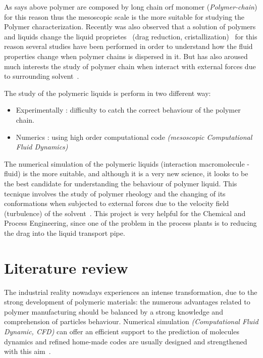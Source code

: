 As says above polymer are composed by long chain orf monomer (\textit{Polymer-chain}) for this reason thus the mesoscopic scale is the more suitable for studying the Polymer characterization. 
Recently was also observed that a solution of polymers and liquids change the liquid proprietes~\cite{keller} (drag reduction, cristallization)~\cite{doi}
for this reason several studies have been performed in order to understand how the fluid properties change when polymer chains is dispersed in it. 
But has also aroused much interests the study of polymer chain when interact with external forces due to surrounding solvent~\cite{grace}.

The study of the polymeric liquids is perform in two different way:
\begin{itemize}
\item Experimentally : difficulty to catch the correct behaviour of the polymer chain.~\cite{mack}
\item Numerics : using high order computational code \textit{(mesoscopic Computational Fluid Dynamics)}~\cite{demos5}
\end{itemize}

The numerical simulation of the polymeric liquids (interaction macromolecule - fluid) is the more suitable,
and although it is a very new science, it looks to be the best candidate for understanding the behaviour of polymer liquid.
This tecnique involves the study of polymer rheology and the changing of its conformations when subjected to external forces due to the velocity field (turbulence) of the solvent~\cite{demos4}. 
This project is very helpful for the Chemical and Process Engineering, since one of the problem in the process plants is to reducing the drag into the liquid transport pipe.  


\section{Literature review}
The industrial reality nowadays experiences an intense transformation, due to the strong development of polymeric materials: the numerous advantages related to polymer manufacturing should be balanced by a strong knowledge and comprehension of particles behaviour. Numerical simulation \textit{(Computational Fluid Dynamic, CFD)} can offer an efficient support to the prediction of molecules dynamics and refined home-made codes are usually designed and strengthened with this aim~\cite{dynamic}.


